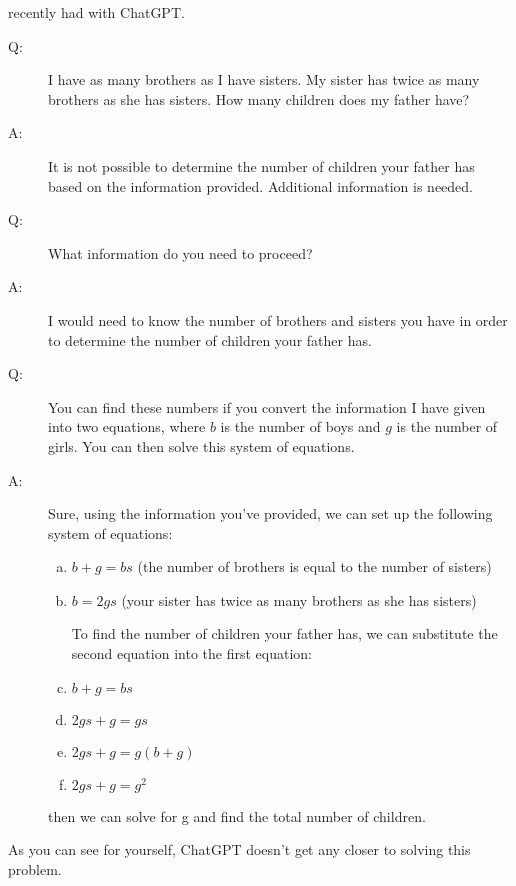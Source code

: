 \begin{enumerate}
      recently had with ChatGPT.
      \begin{description}
       \item[Q:] I have as many brothers as I have sisters.  My sister has twice as many brothers as she has
                 sisters.  How many children does my father have?  
       \item[A:] It is not possible to determine the number of children your father has based on the
                 information provided. Additional information is needed.        
       \item[Q:] What information do you need to proceed?
       \item[A:] I would need to know the number of brothers and sisters you have in order to determine the
                 number of children your father has.  
       \item[Q:] You can find these numbers if you convert the information I have given into two equations,
                 where $b$ is the number of boys and $g$ is the number of girls.  You can then solve this
                 system of equations.    
       \item[A:] Sure, using the information you've provided, we can set up the following system of equations:
                \begin{enumerate}[(a)]
                \item $b + g = bs$ (the number of brothers is equal to the number of sisters)
                \item $b = 2gs$ (your sister has twice as many brothers as she has sisters)

                      To find the number of children your father has, we can substitute the second equation into
                      the first equation: 
                \item $b + g = bs$
                \item $2gs + g = gs$
                \item $2gs + g = g (b + g)$
                \item $2gs + g = g^2$
                \end{enumerate}
                then we can solve for g and find the total number of children.
      \end{description}
      As you can see for yourself, ChatGPT doesn't get any closer to solving this problem.
      

\end{enumerate}
